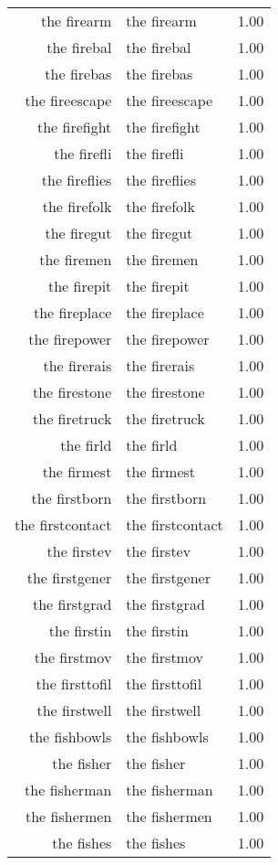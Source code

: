 \begin{table}[ht]
\begin{tabular}{rlr}
  the firearm & the firearm & 1.00 \\ 
  the firebal & the firebal & 1.00 \\ 
  the firebas & the firebas & 1.00 \\ 
  the fireescape & the fireescape & 1.00 \\ 
  the firefight & the firefight & 1.00 \\ 
  the firefli & the firefli & 1.00 \\ 
  the fireflies & the fireflies & 1.00 \\ 
  the firefolk & the firefolk & 1.00 \\ 
  the firegut & the firegut & 1.00 \\ 
  the firemen & the firemen & 1.00 \\ 
  the firepit & the firepit & 1.00 \\ 
  the fireplace & the fireplace & 1.00 \\ 
  the firepower & the firepower & 1.00 \\ 
  the firerais & the firerais & 1.00 \\ 
  the firestone & the firestone & 1.00 \\ 
  the firetruck & the firetruck & 1.00 \\ 
  the firld & the firld & 1.00 \\ 
  the firmest & the firmest & 1.00 \\ 
  the firstborn & the firstborn & 1.00 \\ 
  the firstcontact & the firstcontact & 1.00 \\ 
  the firstev & the firstev & 1.00 \\ 
  the firstgener & the firstgener & 1.00 \\ 
  the firstgrad & the firstgrad & 1.00 \\ 
  the firstin & the firstin & 1.00 \\ 
  the firstmov & the firstmov & 1.00 \\ 
  the firsttofil & the firsttofil & 1.00 \\ 
  the firstwell & the firstwell & 1.00 \\ 
  the fishbowls & the fishbowls & 1.00 \\ 
  the fisher & the fisher & 1.00 \\ 
  the fisherman & the fisherman & 1.00 \\ 
  the fishermen & the fishermen & 1.00 \\ 
  the fishes & the fishes & 1.00 \\ 

\end{tabular}
\end{table}
